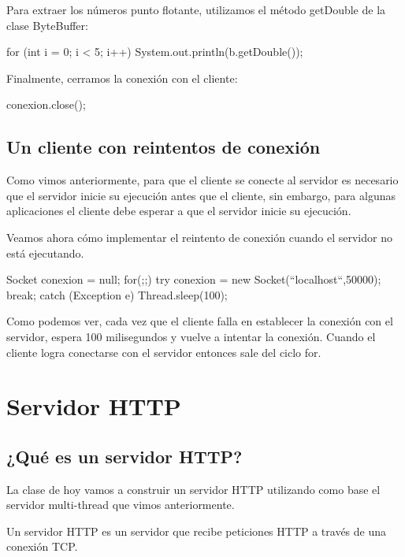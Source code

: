 Para extraer los números punto flotante, utilizamos el método getDouble de la clase ByteBuffer:

\begin{SourceCode}
for (int i = 0; i < 5; i++) System.out.println(b.getDouble());    
\end{SourceCode}

Finalmente, cerramos la conexión con el cliente:

\begin{SourceCode}
conexion.close();
\end{SourceCode}

\section{Un cliente con reintentos de conexión}

Como vimos anteriormente, para que el cliente se conecte al servidor es necesario que el servidor inicie su ejecución antes que el cliente, sin embargo, para algunas aplicaciones el cliente debe esperar a que el servidor inicie su ejecución.

Veamos ahora cómo implementar el reintento de conexión cuando el servidor no está ejecutando.

\begin{SourceCode}
Socket conexion = null;
for(;;)
  try
  {
    conexion = new Socket(``localhost``,50000);
    break;
  }
  catch (Exception e)
  {
    Thread.sleep(100);
  }
\end{SourceCode}

Como podemos ver, cada vez que el cliente falla en establecer la conexión con el servidor, espera 100 milisegundos y vuelve a intentar la conexión. Cuando el cliente logra conectarse con el servidor entonces sale del ciclo for.

\chapter{Servidor HTTP}

\section{¿Qué es un servidor HTTP?}

La clase de hoy vamos a construir un servidor HTTP utilizando como base el servidor multi-thread que vimos anteriormente.

Un servidor HTTP es un servidor que recibe peticiones HTTP a través de una conexión TCP.

